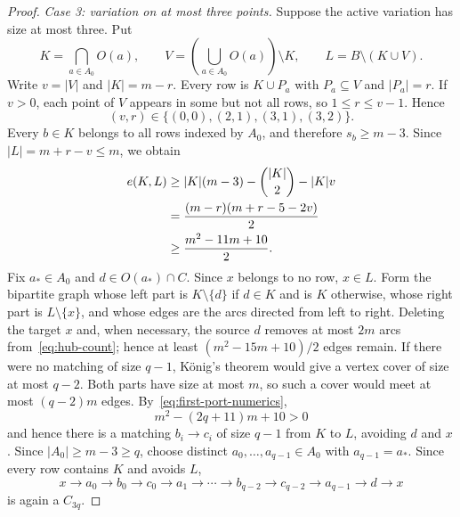 \documentclass[10pt,a4paper]{amsart}
\begin{document}
\begin{proof}
\smallskip
\noindent\emph{Case 3: variation on at most three points.}
Suppose the active variation has size at most three.  Put
\[
  K=\bigcap_{a\in A_0}O(a),\qquad
  V=\left(\bigcup_{a\in A_0}O(a)\right)\setminus K,
  \qquad L=B\setminus(K\cup V).
\]
Write $v=|V|$ and $|K|=m-r$.  Every row is $K\cup P_a$ with $P_a\subseteq V$ and $|P_a|=r$.  If $v>0$, each point of $V$ appears in some but not all rows, so $1\le r\le v-1$.  Hence
\[
  (v,r)\in\{(0,0),(2,1),(3,1),(3,2)\}.
\]
Every $b\in K$ belongs to all rows indexed by $A_0$, and therefore $s_b\ge m-3$.  Since $|L|=m+r-v\le m$, we obtain
\begin{align}
e(K,L)
&\ge |K|(m-3)-\binom{|K|}{2}-|K|v\notag\\
&=\frac{(m-r)(m+r-5-2v)}2\notag\\
&\ge\frac{m^2-11m+10}{2}.
\label{eq:hub-count}
\end{align}
Fix $a_*\in A_0$ and $d\in O(a_*)\cap C$.  Since $x$ belongs to no
row, $x\in L$.  Form the bipartite graph whose left part is
$K\setminus\{d\}$ if $d\in K$ and is $K$ otherwise, whose right part
is $L\setminus\{x\}$, and whose edges are the arcs directed from left
to right.  Deleting the target $x$ and, when necessary, the source $d$
removes at most $2m$ arcs from~\eqref{eq:hub-count}; hence at least
$(m^2-15m+10)/2$ edges remain.  If there were no matching of size
$q-1$, K\"onig's theorem would give a vertex cover of size at most
$q-2$.  Both parts have size at most $m$, so such a cover would meet at
most $(q-2)m$ edges.  By~\eqref{eq:first-port-numerics},
\[
  m^2-(2q+11)m+10>0
\]
and hence there is a matching $b_i\to c_i$ of size $q-1$ from $K$ to
$L$, avoiding $d$ and $x$.  Since $|A_0|\ge m-3\ge q$, choose
distinct $a_0,\ldots,a_{q-1}\in A_0$ with $a_{q-1}=a_*$.  Since every
row contains $K$ and avoids $L$,
\[
  x\to a_0\to b_0\to c_0\to a_1\to\cdots
  \to b_{q-2}\to c_{q-2}\to a_{q-1}\to d\to x
\]
is again a $C_{3q}$.
\end{proof}
\end{document}
